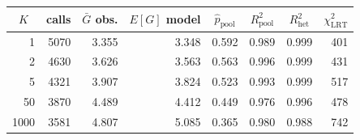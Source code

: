 \begin{tabular}{rrrrrrrr}
\toprule
\multicolumn{1}{c}{$K$} & \multicolumn{1}{c}{calls} & \multicolumn{1}{c}{$\bar G$ obs.} & \multicolumn{1}{c}{$E[G]$ model} & \multicolumn{1}{c}{$\hat p_{\mathrm{pool}}$} & \multicolumn{1}{c}{$R^2_{\mathrm{pool}}$} & \multicolumn{1}{c}{$R^2_{\mathrm{het}}$} & \multicolumn{1}{c}{$\chi^2_{\mathrm{LRT}}$} \\
\midrule
1 & 5070 & 3.355 & 3.348 & 0.592 & 0.989 & 0.999 & 401 \\
2 & 4630 & 3.626 & 3.563 & 0.563 & 0.996 & 0.999 & 431 \\
5 & 4321 & 3.907 & 3.824 & 0.523 & 0.993 & 0.999 & 517 \\
50 & 3870 & 4.489 & 4.412 & 0.449 & 0.976 & 0.996 & 478 \\
1000 & 3581 & 4.807 & 5.085 & 0.365 & 0.980 & 0.988 & 742 \\
\bottomrule
\end{tabular}